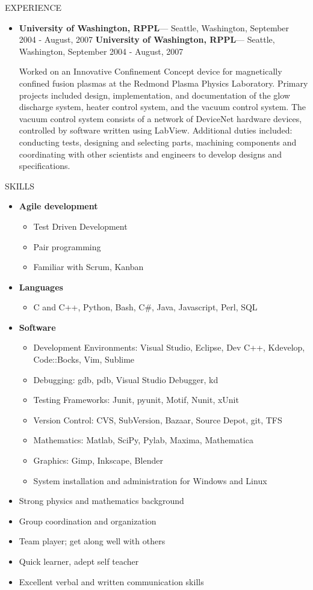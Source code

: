 \documentclass[11pt,oneside]{article}
\newenvironment{ressection}[1]{
	\vspace{4pt}
	{\fontfamily{phv}\selectfont\Large#1}
	\begin{itemize}
	\vspace{3pt}
}{
	\end{itemize}
}
\newcommand{\resitem}[1]{
	\vspace{-4pt}
	\item \begin{flushleft} #1 \end{flushleft}
}
\newcommand{\ressubitem}[1]{
	\vspace{-1pt}
	\item \begin{flushleft} #1 \end{flushleft}
}
\newcommand{\resbigitem}[3]{
	\vspace{-5pt}
	\item
	\ifthenelse{\equal{#3}{}}
	{\textbf{#1}---#2 } %
	{\textbf{#1}---#2 \\ \textit{#3} } 
}
\newenvironment{ressubsec}[3]{
	\resbigitem{#1}{#2}{#3}
	\vspace{-2pt}
	\begin{itemize}
}{
	\end{itemize}
}
\newenvironment{reslist}[1]{
	\resitem{\textbf{#1}}
	\vspace{-5pt}
	\begin{itemize}
}{
	\end{itemize}
}
\begin{document}
\begin{ressection}{EXPERIENCE}
\begin{ressubsec}{University of Washington, RPPL}{ Seattle, Washington, September 2004 - August, 2007}
    \ressubitem{Worked on an Innovative Confinement Concept device for magnetically confined fusion plasmas at the Redmond
    Plasma Physics Laboratory. Primary projects included design, implementation, and documentation of the glow
    discharge system, heater control system, and the vacuum control system. The vacuum control system consists of
    a network of DeviceNet hardware devices, controlled by software written using LabView. Additional duties
    included: conducting tests, designing and selecting parts, machining components and coordinating with other
    scientists and engineers to develop designs and specifications.}
	\end{ressubsec}
\end{ressection}


\begin{ressection}{SKILLS}
    \begin{reslist}{Agile development}
    \ressubitem{Test Driven Development}
    \ressubitem{Pair programming}
    \ressubitem{Familiar with Scrum, Kanban}
    \end{reslist}
    \begin{reslist}{ Languages}
\ressubitem{C and C++, Python, Bash, C\#, Java, Javascript, Perl, SQL}
    \end{reslist}
    \begin{reslist}{ Software}
\ressubitem{Development Environments: Visual Studio, Eclipse, Dev C++, Kdevelop, Code::Bocks, Vim, Sublime}
\ressubitem{Debugging: gdb, pdb, Visual Studio Debugger, kd}
\ressubitem{Testing Frameworks: Junit, pyunit, Motif, Nunit, xUnit}
\ressubitem{Version Control: CVS, SubVersion, Bazaar, Source Depot, git, TFS}
\ressubitem{Mathematics: Matlab, SciPy, Pylab, Maxima, Mathematica}
\ressubitem{Graphics: Gimp, Inkscape, Blender}
\ressubitem{System installation and administration for Windows and Linux}
    \end{reslist}
\resitem{Strong physics and mathematics background}
\resitem{Group coordination and organization}
\resitem{Team player; get along well with others}
\resitem{Quick learner, adept self teacher}
\resitem{Excellent verbal and written communication skills}
\end{ressection}
\end{document}
